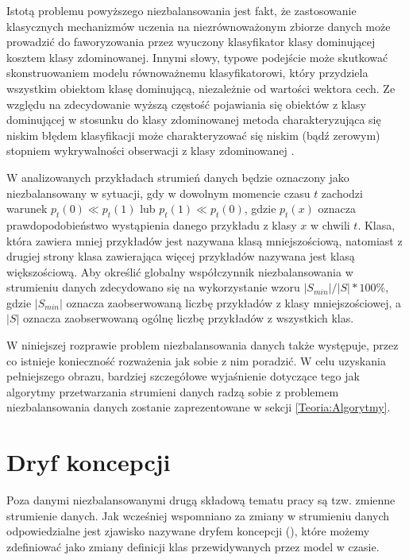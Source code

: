 Istotą problemu powyższego niezbalansowania jest fakt, że zastosowanie klasycznych mechanizmów uczenia na niezrównoważonym zbiorze danych może prowadzić do faworyzowania przez wyuczony klasyfikator klasy dominującej kosztem klasy zdominowanej. Innymi słowy, typowe podejście może skutkować skonstruowaniem modelu równoważnemu klasyfikatorowi, który przydziela wszystkim obiektom klasę dominującą, niezależnie od wartości wektora cech. Ze względu na zdecydowanie wyższą częstość pojawiania się obiektów z klasy dominującej w stosunku do klasy zdominowanej metoda charakteryzująca się niskim błędem klasyfikacji może charakteryzować się niskim (bądź zerowym) stopniem wykrywalności obserwacji z klasy zdominowanej \cite{MZieba}.

\label{Label:ImbalanceData}
W analizowanych przykładach strumień danych będzie oznaczony jako niezbalansowany w sytuacji, gdy w dowolnym momencie czasu $t$ zachodzi warunek $p_t(0) \ll p_t(1)$ lub $p_t(1) \ll p_t(0)$, gdzie $p_t(x)$ oznacza prawdopodobieństwo wystąpienia danego przykładu z klasy $x$ w chwili $t$. Klasa, która zawiera mniej przykładów jest nazywana klasą mniejszościową, natomiast z drugiej strony klasa zawierająca więcej przykładów nazywana jest klasą większościową. Aby określić globalny współczynnik niezbalansowania w strumieniu danych zdecydowano się na wykorzystanie wzoru $|S_{min}|/|S| * 100\%$, gdzie $|S_{min}|$ oznacza zaobserwowaną liczbę przykładów z klasy mniejszościowej, a $|S|$ oznacza zaobserwowaną ogólnę liczbę przykładów z wszystkich klas.

W niniejszej rozprawie problem niezbalansowania danych także występuje, przez co istnieje konieczność rozważenia jak sobie z nim poradzić. W celu uzyskania pełniejszego obrazu, bardziej szczegółowe wyjaśnienie dotyczące tego jak algorytmy przetwarzania strumieni danych radzą sobie z problemem niezbalansowania danych zostanie zaprezentowane w sekcji \ref{Teoria:Algorytmy}.


\section{Dryf koncepcji}

\noindent Poza danymi niezbalansowanymi drugą składową tematu pracy są tzw. zmienne strumienie danych. Jak wcześniej wspomniano za zmiany w strumieniu danych odpowiedzialne jest zjawisko nazywane dryfem koncepcji (), które możemy zdefiniować jako zmiany definicji klas przewidywanych przez model w czasie.


